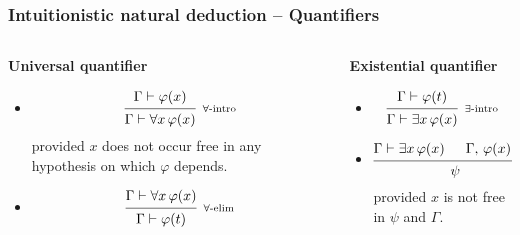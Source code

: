 \documentclass{beamer}
\begin{document}
\begin{frame}
  \frametitle{Intuitionistic natural deduction -- Quantifiers}
  \begin{columns}
  \begin{column}{.5\textwidth}
      \textbf{\qquad Universal quantifier}
      \minipage[c][0.5\textheight][s]{\columnwidth}
      \vspace{0.05\textheight}
      \begin{itemize}
      \item
      \[
        \begin{prooftree}
          \hypo{\Gamma \vdash \varphi(x)}
          \infer1[\scriptsize $\forall$-intro]{\Gamma \vdash \forall x \, \varphi(x)}
        \end{prooftree}
      \]
      provided $x$ does not occur free in any hypothesis on which $\varphi$ depends.

      \item
      \[
        \begin{prooftree}
          \hypo{\Gamma \vdash \forall x \, \varphi(x)}
          \infer1[\scriptsize $\forall$-elim]{\Gamma \vdash \varphi(t)}
        \end{prooftree}
      \]
      \end{itemize}
      \endminipage
    \end{column}

    \begin{column}{.5\textwidth}
      \textbf{\qquad Existential quantifier}
      \minipage[c][0.5\textheight][s]{\columnwidth}
      \vspace{0.05\textheight}
      \begin{itemize}
      \item
      \[
        \begin{prooftree}
          \hypo{\Gamma \vdash \varphi(t)}
          \infer1[\scriptsize $\exists$-intro]{\Gamma \vdash \exists x \, \varphi(x)}
        \end{prooftree}
      \]

      \item
      \[
        \begin{prooftree}
          \hypo{\Gamma \vdash \exists x \, \varphi(x)}
          \hypo{\Gamma, \, \varphi(x) \vdash \psi}
          \infer2[\scriptsize $\exists$-elim]{\psi}
        \end{prooftree}
      \]
      provided $x$ is not free in $\psi$ and $\Gamma$.
      \end{itemize}
      \endminipage
    \end{column}
  \end{columns}
\end{frame}
\end{document}
